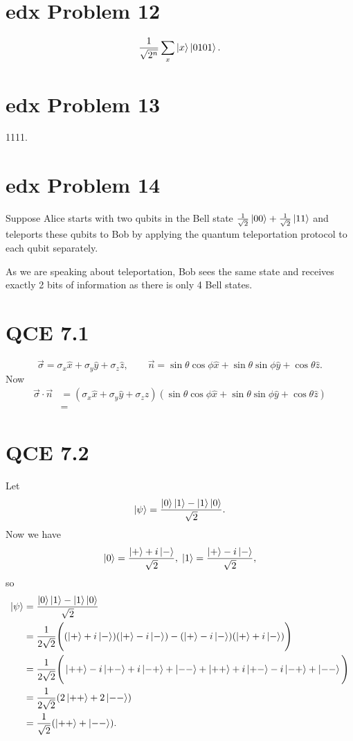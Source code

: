 \documentclass[10pt]{article}
\begin{document}
\section*{edx Problem 12}
\[
\frac{1}{\sqrt{2^n}} \sum_{x} \ket{x} \ket{0101}. 
\]

\section*{edx Problem 13}
1111.

\section*{edx Problem 14}
Suppose Alice starts with two qubits in the Bell state $\frac{1}{\sqrt{2}} \ket{00} + \frac{1}{\sqrt{2}} \ket{11}$ and teleports these qubits to Bob by applying the quantum teleportation protocol to each qubit separately.

As we are speaking about teleportation, Bob sees the same state and receives exactly 2 bits of information as there is only 4 Bell states.

\section*{QCE 7.1}
\[
\vec{\sigma} = \sigma_x \hat{x} + \sigma_y \hat{y} + \sigma_z \hat{z}, \qquad
\vec{n} = \sin \theta \cos \phi \hat{x} + \sin \theta \sin \phi \hat{y} + \cos \theta \hat{z}.
\]
Now
\begin{align*}
\vec{\sigma} \cdot \vec{n} &= (\sigma_x \hat{x} + \sigma_y \hat{y} + \sigma_z \hat{z})(\sin \theta \cos \phi \hat{x} + \sin \theta \sin \phi \hat{y} + \cos \theta \hat{z}) \\
            							   &= 
\end{align*}

\section*{QCE 7.2}
Let 
\[
\ket{\psi} = \frac{\ket{0}\ket{1} - \ket{1}\ket{0}}{\sqrt{2}}.
\]
Now we have
\[ 
\ket{0} = \frac{\ket{+} + i\ket{-}}{\sqrt{2}}, \; \ket{1} = \frac{\ket{+} - i\ket{-}}{\sqrt{2}},
\]
so 
\begin{align*}
\ket{\psi} &= \frac{\ket{0}\ket{1} - \ket{1}\ket{0}}{\sqrt{2}} \\
                &= \frac{1}{2\sqrt{2}} \Bigg( (\ket{+} + i\ket{-}) ( \ket{+} - i\ket{-} ) - (\ket{+} - i\ket{-}) ( \ket{+} + i\ket{-} ) \Bigg) \\
                &= \frac{1}{2\sqrt{2}} \Bigg( \ket{++} - i\ket{+-} + i \ket{-+} +\ket{--} + \ket{++} + i\ket{+-} -i \ket{-+} + \ket{--}\Bigg) \\
                &= \frac{1}{2\sqrt{2}} ( 2\ket{++}  + 2\ket{--}) \\
                &= \frac{1}{\sqrt{2}} (\ket{++} + \ket{--}).
\end{align*}
\end{document}
